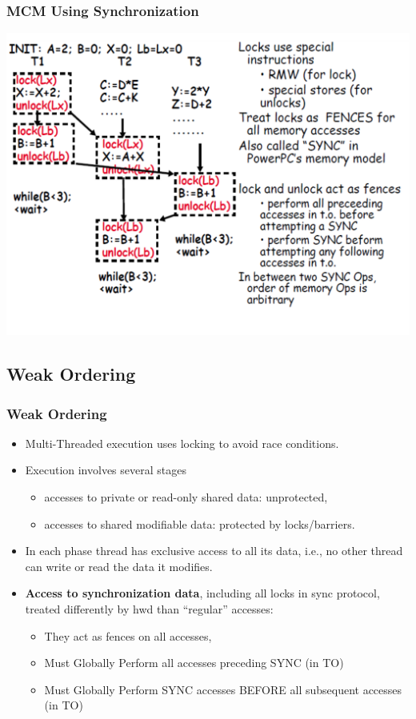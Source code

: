 \documentclass{beamer}
\newcommand{\emp}[1]{\textcolor{DikuRed}{ #1}}
\begin{document}
\begin{frame}[fragile,t]
\frametitle{MCM Using Synchronization}

\includegraphics[width=65ex]{Ch7Figs/MCSsync}

\end{frame}


\subsection{Weak Ordering}

\begin{frame}[fragile,t]
\frametitle{Weak Ordering}

\begin{itemize}
    \item Multi-Threaded execution uses locking to avoid race conditions.\medskip

    \item Execution involves several stages
        \begin{itemize}
            \item accesses to private or read-only shared data: unprotected,
            \item accesses to shared modifiable data: protected by locks/barriers.
        \end  {itemize}\medskip

    \item In each phase thread has exclusive access to all its data,
            i.e., no other thread can write or read the data it modifies.\medskip 

    \item \emp{\bf Access to synchronization data}, including all locks in sync protocol,
                treated differently by hwd than ``regular'' accesses:
        \begin{itemize}
            \item They act as fences on all accesses,
            \item Must Globally Perform all accesses preceding SYNC (in TO)
            \item Must Globally Perform SYNC accesses BEFORE all subsequent accesses (in TO)   
        \end  {itemize}\medskip

\end{itemize}

\end{frame}
\end{document}
